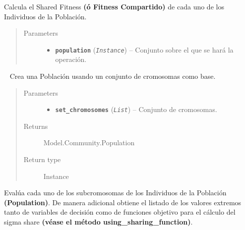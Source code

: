 \documentclass[class=report, crop=false]{standalone}
\begin{document}
\begin{fulllineitems}
\begin{fulllineitems}

Calcula el Shared Fitness \textbf{(ó Fitness Compartido)} 
de cada uno de los Individuos de la Población.

\begin{quote}\begin{description}
\item[{Parameters}] \leavevmode\begin{itemize}
\item \textbf{\texttt{population}} (\emph{\texttt{Instance}}) -- Conjunto sobre el que se hará la operación.
\end{itemize}
\end{description}\end{quote}

\end{fulllineitems}

\begin{fulllineitems}

~
\vspace{-0.1cm}
Crea una Población usando un conjunto de 
cromosomas como base.

\begin{quote}\begin{description}
\item[{Parameters}] \leavevmode\begin{itemize}
\item \textbf{\texttt{set\_chromosomes}} (\emph{\texttt{List}}) -- Conjunto de cromosomas.
\end{itemize}
\item[{Returns}] \leavevmode
Model.Community.Population
\item[{Return type}] \leavevmode
Instance
\end{description}\end{quote}

\end{fulllineitems}

\begin{fulllineitems}

Evalúa cada uno de los subcromosomas de los Individuos de la 
Población \textbf{(Population)}.\break
De manera adicional obtiene el listado de los valores extremos 
tanto de variables de decisión como de funciones objetivo para 
el cálculo del sigma share \textbf{(véase el método using\_sharing\_function)}. 


\end{fulllineitems}
\end{fulllineitems}
\end{document}
